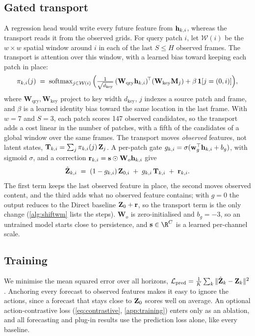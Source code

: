 \subsection{Gated transport}
\label{sec:transport}
A regression head would write every future feature from $\mathbf{h}_{k,i}$, whereas the transport reads it from the observed
grids.
%
For query patch $i$, let $\mathcal{W}(i)$ be the $w\times w$ spatial window around $i$ in each of the last $S\le H$
observed frames. The transport is attention over this window, with a learned bias toward keeping each patch in place:
\begin{equation}
  \pi_{k,i}(j) \;=\; \operatorname{softmax}_{j\in\mathcal{W}(i)}\Big(
  \tfrac{1}{\sqrt{d_{\text{key}}}}\,(\mathbf{W}_{\text{qry}}\mathbf{h}_{k,i})^{\!\top}(\mathbf{W}_{\text{key}}\mathbf{M}_{j}) + \beta\,\mathbf{1}[j=(0,i)]\Big),
  \label{eq:transport}
\end{equation}
where $\mathbf{W}_{\text{qry}},\mathbf{W}_{\text{key}}$ project to key width $d_{\text{key}}$, $j$ indexes a source patch and
frame, and $\beta$ is a learned identity bias toward the same location in the last frame.
%
With $w{=}7$ and $S{=}3$, each patch scores 147 observed candidates, so the transport adds a cost linear in the number
of patches, with a fifth of the candidates of a global window over the same frames.
%
The transport moves \emph{observed} features, not latent states, $\mathbf{T}_{k,i}=\sum_{j}\pi_{k,i}(j)\,\mathbf{Z}_j$.
%
A per-patch gate
$g_{k,i}=\sigma(\mathbf{w}_g^\top\mathbf{h}_{k,i}+b_g)$, with sigmoid $\sigma$, and a correction $\mathbf{r}_{k,i}=\mathbf{s}\odot\mathbf{W}_o\mathbf{h}_{k,i}$ give
\begin{equation}
  \hat{\mathbf{Z}}_{k,i} \;=\; (1-g_{k,i})\,\mathbf{Z}_{0,i} \;+\; g_{k,i}\,\mathbf{T}_{k,i} \;+\; \mathbf{r}_{k,i}.
  \label{eq:output}
\end{equation}
The first term keeps the last observed feature in place, the second moves observed content, and the third adds what
no observed feature contains; with $g{=}0$ the output reduces to the Direct baseline $\mathbf{Z}_0+\mathbf{r}$, so the transport term
is the only change (\cref{alg:shiftwm} lists the steps).
%
$\mathbf{W}_o$ is zero-initialised and $b_g=-3$, so an untrained model starts close to persistence, and $\mathbf{s}\in\R^C$ is a learned per-channel scale.

\subsection{Training}
\label{sec:training}
We minimise the mean squared error over all horizons, $\mathcal{L}_{\text{pred}}=\frac1K\sum_k\|\hat{\mathbf{Z}}_k-\mathbf{Z}_k\|^2$.
%
Anchoring every forecast to observed features makes it easy to ignore the actions, since a forecast that stays close
to $\mathbf{Z}_0$ scores well on average.
%
An optional action-contrastive loss (\cref{eq:contrastive}, \cref{app:training}) enters only as an ablation, and all
forecasting and plug-in results use the prediction loss alone, like every baseline.

